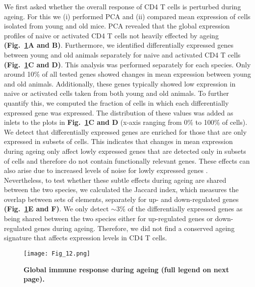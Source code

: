 We first asked whether the overall response of CD4\plus{} T cells is perturbed during ageing. For this we (i) performed PCA and (ii) compared mean expression of cells isolated from young and old mice. PCA revealed that the global expression profiles of naive or activated CD4\plus{} T cells not heavily effected by ageing \textbf{(Fig.~\ref{fig1:mean_expression_ageing}A and B)}. Furthermore, we identified differentially expressed genes between young and old animals separately for naive and activated CD4\plus{} T cells \textbf{(Fig.~\ref{fig1:mean_expression_ageing}C and D)}. This analysis was performed separately for each species. Only around 10\% of all tested genes showed changes in mean expression between young and old animals. Additionally, these genes typically showed low expression in naive or activated cells taken from both young and old animals. To further quantify this, we computed the fraction of cells in which each differentially expressed gene was expressed. The distribution of these values was added as inlets to the plots in \textbf{Fig.~\ref{fig1:mean_expression_ageing}C and D} (x-axis ranging from 0\% to 100\% of cells). We detect that differentially expressed genes are enriched for those that are only expressed in subsets of cells. This indicates that changes in mean expression during ageing only affect lowly expressed genes that are detected only in subsets of cells and therefore do not contain functionally relevant genes. These effects can also arise due to increased levels of noise for lowly expressed genes \citep{Brennecke2013}. \\

Nevertheless, to test whether these subtle effects during ageing are shared between the two species, we calculated the Jaccard index, which measures the overlap between sets of elements, separately for up- and down-regulated genes \textbf{(Fig.~\ref{fig1:mean_expression_ageing}E and F)}. We only detect $\sim$3\% of the differentially expressed genes as being shared between the two species either for up-regulated genes or down-regulated genes during ageing. Therefore, we did not find a conserved ageing signature that affects expression levels in CD4\plus{} T cells.

\begin{figure}[!ht]
\centering
\texttt{[image: Fig\_12.png]}
\caption[Global immune response during ageing]{\textbf{Global immune response during ageing (full legend on next page).}}
\label{fig1:mean_expression_ageing}
\end{figure}

